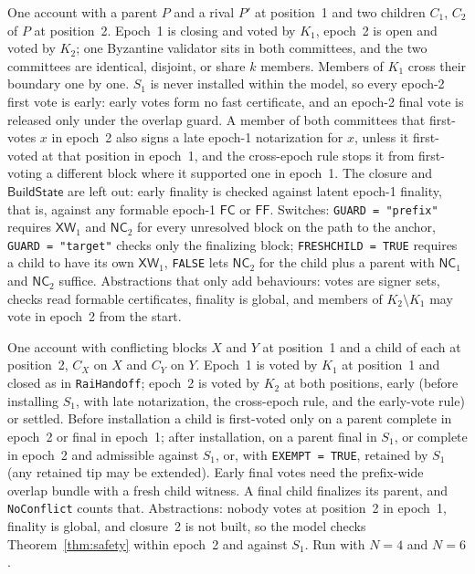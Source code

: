 \documentclass[conference]{IEEEtran}
\newcommand{\NC}{\mathsf{NC}}
\newcommand{\XW}{\mathsf{XW}}
\newcommand{\FC}{\mathsf{FC}}
\newcommand{\FF}{\mathsf{FF}}
\newcommand{\Build}{\mathsf{BuildState}}
\begin{document}
One account with a parent $P$ and a rival $P'$ at position~1 and two children $C_1$, $C_2$ of $P$ at position~2. Epoch~1 is closing and voted by $K_1$, epoch~2 is open and voted by $K_2$; one Byzantine validator sits in both committees, and the two committees are identical, disjoint, or share $k$ members. Members of $K_1$ cross their boundary one by one. $S_1$ is never installed within the model, so every epoch-2 first vote is early: early votes form no fast certificate, and an epoch-2 final vote is released only under the overlap guard. A member of both committees that first-votes $x$ in epoch~2 also signs a late epoch-1 notarization for $x$, unless it first-voted at that position in epoch~1, and the cross-epoch rule stops it from first-voting a different block where it supported one in epoch~1. The closure and $\Build$ are left out: early finality is checked against latent epoch-1 finality, that is, against any formable epoch-1 $\FC$ or $\FF$. Switches: \texttt{GUARD = "prefix"} requires $\XW_1$ and $\NC_2$ for every unresolved block on the path to the anchor, \texttt{GUARD = "target"} checks only the finalizing block; \texttt{FRESHCHILD = TRUE} requires a child to have its own $\XW_1$, \texttt{FALSE} lets $\NC_2$ for the child plus a parent with $\NC_1$ and $\NC_2$ suffice. Abstractions that only add behaviours: votes are signer sets, checks read formable certificates, finality is global, and members of $K_2\setminus K_1$ may vote in epoch~2 from the start.

One account with conflicting blocks $X$ and $Y$ at position~1 and a child of each at position~2, $C_X$ on $X$ and $C_Y$ on $Y$. Epoch~1 is voted by $K_1$ at position~1 and closed as in \texttt{RaiHandoff}; epoch~2 is voted by $K_2$ at both positions, early (before installing $S_1$, with late notarization, the cross-epoch rule, and the early-vote rule) or settled. Before installation a child is first-voted only on a parent complete in epoch~2 or final in epoch~1; after installation, on a parent final in $S_1$, or complete in epoch~2 and admissible against $S_1$, or, with \texttt{EXEMPT = TRUE}, retained by $S_1$ (any retained tip may be extended). Early final votes need the prefix-wide overlap bundle with a fresh child witness. A final child finalizes its parent, and \texttt{NoConflict} counts that. Abstractions: nobody votes at position~2 in epoch~1, finality is global, and closure~2 is not built, so the model checks Theorem~\ref{thm:safety} within epoch~2 and against $S_1$. Run with $N=4$ and $N=6$.
\end{document}
